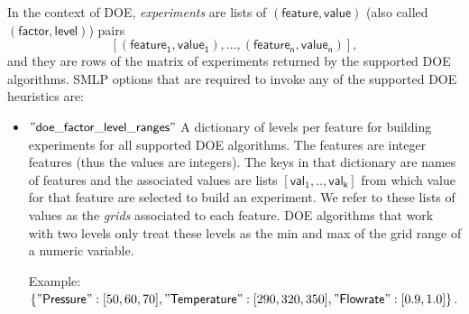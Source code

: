 \documentclass[a4paper,parskip=half]{article} %
\newcommand*\speckey[1]{\operatorname{\mathsf{"{#1}"}}} %
\newcommand*\specval[1]{\operatorname{\mathsf{{#1}}}} %
\begin{document}
In the context of DOE, \emph{experiments} are lists of $\specval{(feature,value)}$ (also called  $\specval{(factor,level)}$) pairs
$$[(\specval{feature_1}, \specval{value_1}),\ldots,(\specval{feature_n}, \specval{value_n})],$$
\noindent and they are rows of the matrix of experiments returned by the supported DOE algorithms.
SMLP options that are required to invoke any of the supported DOE heuristics are:
\begin{itemize}
\item $\speckey{doe\_factor\_level\_ranges}$ A dictionary of levels per feature for building experiments for all supported DOE algorithms. 
The features are integer features (thus the values are integers). 
The keys in that dictionary are names of  features and the associated values are lists $\specval{[val_1, .., val_k]}$
from which value for that feature are selected to build an experiment. We refer to these lists of values as the \emph{grids} associated to 
each feature. DOE algorithms that work with two levels only treat these levels as the min and max of the grid range of a numeric variable.

Example: $\{\speckey{Pressure}:[50,60,70], \speckey{Temperature}:[290, 320, 350], \speckey{Flow rate}:[0.9,1.0]\}$. 


\end{itemize}
\end{document}
